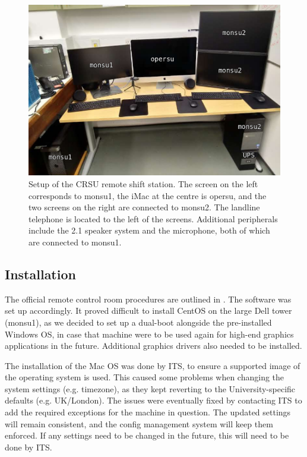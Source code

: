 \documentclass[a4paper,10pt]{article}
\begin{document}
\begin{figure}[htp]
	\includegraphics[width=\textwidth]{images/CRSU_final}
	\caption{Setup of the CRSU remote shift station. The screen on the left corresponds to monsu1, the iMac at the centre is opersu, and the two screens on the right are connected to monsu2. The landline telephone is located to the left of the screens. Additional peripherals include the 2.1 speaker system and the microphone, both of which are connected to monsu1.}
	\label{crsu_setup}
\end{figure}

\subsection{Installation}
The official remote control room procedures are outlined in \cite{doc4776}. The software was set up accordingly. It proved difficult to install CentOS on the large Dell tower (monsu1), as we decided to set up a dual-boot alongside the pre-installed Windows OS, in case that machine were to be used again for high-end graphics applications in the future. Additional graphics drivers also needed to be installed.

The installation of the Mac OS was done by ITS, to ensure a supported image of the operating system is used. This caused some problems when changing the system settings (e.g. timezone), as they kept reverting to the University-specific defaults (e.g. UK/London). The issues were eventually fixed by contacting ITS to add the required exceptions for the machine in question. The updated settings will remain consistent, and the config management system will keep them enforced. If any settings need to be changed in the future, this will need to be done by ITS.
\end{document}
